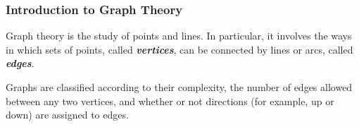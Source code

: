\documentclass[12pt]{beamer} %
\begin{document}
\begin{frame}
\frametitle{Introduction to Graph Theory}
Graph theory is the study of points and lines. In particular, it involves the ways in which sets of points, called \textit{\textbf{vertices}}, can be connected by lines or arcs, called \textit{\textbf{edges}}.

Graphs are classified according to their complexity, the number of edges allowed between any two vertices, and whether or not directions (for example, up or down) are assigned to edges. 
\end{frame}
\end{document}

